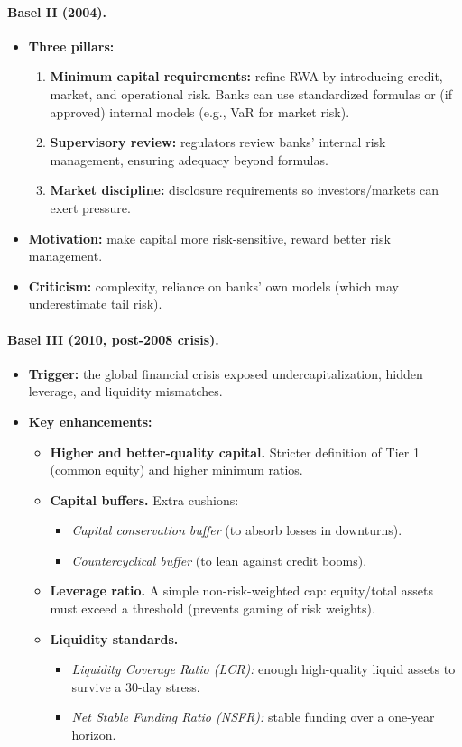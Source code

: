 \paragraph{Basel II (2004).}
\begin{itemize}
  \item \textbf{Three pillars:}
  \begin{enumerate}
    \item \textbf{Minimum capital requirements:} refine RWA by introducing credit, market, and operational risk. Banks can use standardized formulas or (if approved) internal models (e.g., VaR for market risk).
    \item \textbf{Supervisory review:} regulators review banks’ internal risk management, ensuring adequacy beyond formulas.
    \item \textbf{Market discipline:} disclosure requirements so investors/markets can exert pressure.
  \end{enumerate}
  \item \textbf{Motivation:} make capital more risk-sensitive, reward better risk management.
  \item \textbf{Criticism:} complexity, reliance on banks’ own models (which may underestimate tail risk).
\end{itemize}

\paragraph{Basel III (2010, post-2008 crisis).}
\begin{itemize}
  \item \textbf{Trigger:} the global financial crisis exposed undercapitalization, hidden leverage, and liquidity mismatches.
  \item \textbf{Key enhancements:}
  \begin{itemize}
    \item \textbf{Higher and better-quality capital.} Stricter definition of Tier 1 (common equity) and higher minimum ratios.
    \item \textbf{Capital buffers.} Extra cushions: 
      \begin{itemize}
        \item \emph{Capital conservation buffer} (to absorb losses in downturns).
        \item \emph{Countercyclical buffer} (to lean against credit booms).
      \end{itemize}
    \item \textbf{Leverage ratio.} A simple non-risk-weighted cap: equity/total assets must exceed a threshold (prevents gaming of risk weights).
    \item \textbf{Liquidity standards.} 
      \begin{itemize}
        \item \emph{Liquidity Coverage Ratio (LCR):} enough high-quality liquid assets to survive a 30-day stress.
        \item \emph{Net Stable Funding Ratio (NSFR):} stable funding over a one-year horizon.
      \end{itemize}
  \end{itemize}
\end{itemize}

